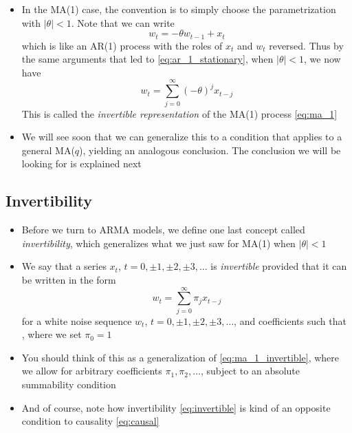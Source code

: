 \documentclass{article}
\begin{document}
\begin{itemize}
\item In the MA(1) case, the convention is to simply choose the parametrization
  with $|\theta| <  1$. Note that we can write
  \[
  w_t = -\theta w_{t-1} + x_t 
  \]
  which is like an AR(1) process with the roles of $x_t$ and $w_t$
  reversed. Thus by the same arguments that led to \eqref{eq:ar_1_stationary},
  when $|\theta| < 1$, we now have 
  \begin{equation}
  \label{eq:ma_1_invertible}
  w_t = \sum_{j=0}^\infty (-\theta)^j x_{t-j} 
  \end{equation}
  This is called the \emph{invertible representation} of the MA(1) process
  \eqref{eq:ma_1} 

\item We will see soon that we can generalize this to a condition that applies
  to a general MA($q$), yielding an analogous conclusion. The conclusion we will
  be looking for is explained next 
\end{itemize}

\subsection{Invertibility}

\begin{itemize}
\item Before we turn to ARMA models, we define one last concept called
  \emph{invertibility}, which generalizes what we just saw for MA(1) when
  $|\theta| < 1$ 

\item We say that a series $x_t$, $t = 0, \pm 1, \pm 2, \pm 3, \dots$ is
  \emph{invertible} provided that it can be written in the form
  \begin{equation}
  \label{eq:invertible}
  w_t = \sum_{j=0}^\infty \pi_j x_{t-j}
  \end{equation}
  for a white noise sequence $w_t$, $t = 0, \pm 1, \pm 2, \pm 3, \dots$,
  and coefficients such that , where 
  we set $\pi_0 = 1$

\item You should think of this as a generalization of
  \eqref{eq:ma_1_invertible}, where we allow for arbitrary coefficients
  $\pi_1,\pi_2,\dots$, subject to an absolute summability condition   

\item And of course, note how invertibility \eqref{eq:invertible} is kind of an
  opposite condition to causality \eqref{eq:causal}  
\end{itemize}
\end{document}
